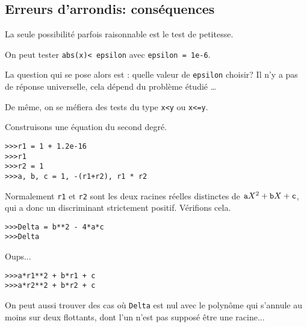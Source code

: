 \subsection{Erreurs d'arrondis: conséquences}


\vspace{0.5cm}

 La seule possibilité parfois raisonnable est  le \og test de petitesse\fg.
\begin{exemple}
  On peut tester \texttt{abs(x)< epsilon} avec \texttt{epsilon = 1e-6}.
\end{exemple}

 La question qui se pose alors est : quelle valeur de \texttt{epsilon} choisir? Il n'y a pas de réponse universelle,  cela dépend du problème étudié \ldots{}


De même, on se méfiera des tests du type \texttt{x<y} ou \texttt{x<=y}.


\begin{exemple}
  
\end{exemple}
 Construisons une équation du second degré.

\begin{lstlisting}
>>>r1 = 1 + 1.2e-16
>>>r1
>>>r2 = 1
>>>a, b, c = 1, -(r1+r2), r1 * r2
\end{lstlisting}
Normalement \texttt{r1} et \texttt{r2} sont les deux racines réelles distinctes de
$\text{\texttt{a}}X^2+\text{\texttt{b}}X+\text{\texttt{c}}$, qui a donc un discriminant strictement positif.
Vérifions cela.
\begin{lstlisting}
>>>Delta = b**2 - 4*a*c
>>>Delta
\end{lstlisting}
Oups...
\begin{lstlisting}
>>>a*r1**2 + b*r1 + c
>>>a*r2**2 + b*r2 + c
\end{lstlisting}

On peut aussi trouver des cas où \texttt{Delta} est nul avec le polynôme
qui s'annule au moins sur deux flottants, dont l'un n'est pas supposé
être une racine...

